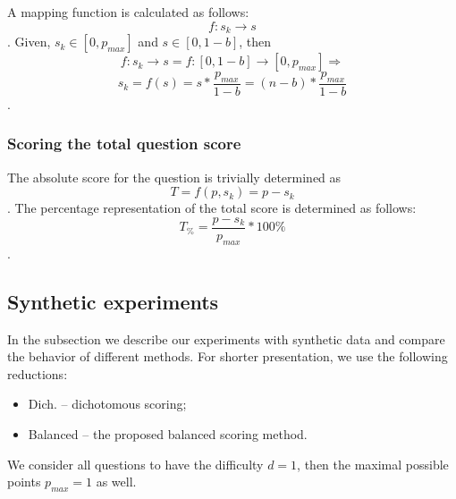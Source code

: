 \documentclass[PhD, Submit, ngerman,UKenglish,table]{scrbook}
\begin{document}
A mapping function is calculated as follows:
\[f : s_k \rightarrow s\].
Given, $s_k \in [0,p_{max}]$ and $s \in [0,1-b]$, then 
\[f : s_k \rightarrow s = f : [0 , {1-b}] \rightarrow [0,p_{max}] \Rightarrow\]
\[s_k = f(s) = s*\frac{p_{max}}{1-b} = (n-b)*\frac{p_{max}}{1-b}\].

\subsubsection{Scoring the total question score}

The absolute score for the question is trivially determined as
\[T = f(p,s_k) = p-s_k \].
The percentage representation of the total score is determined as follows:
\[T_\% = \frac{p - s_k}{p_{max}}*100\%\].


\subsection{Synthetic experiments}
\label{subsec:experiment}

In the subsection we describe our experiments with synthetic data and compare the behavior of different methods.
For shorter presentation, we use the following reductions:

\begin{itemize}
  \item{Dich.} -- dichotomous scoring;
  \item{Balanced} -- the proposed balanced scoring method.
\end{itemize}

We consider all questions to have the difficulty $d = 1$, then the maximal possible points $p_{max} = 1$ as well.
\end{document}
